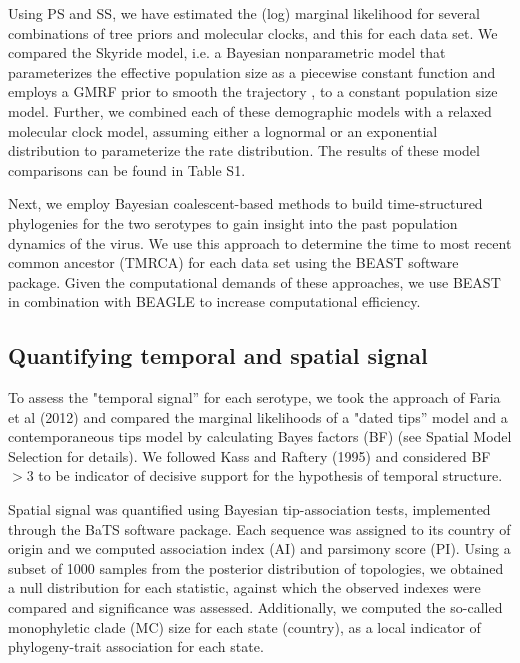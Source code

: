 \documentclass[10pt]{article}
\begin{document}

Using PS and SS, we have estimated the (log) marginal likelihood for several combinations of tree priors and molecular clocks, and this for each data set.
We compared the Skyride model, i.e. a Bayesian nonparametric model that parameterizes the effective population size as a piecewise constant function and employs a GMRF prior to smooth the trajectory \cite{skyride}, to a constant population size model.
Further, we combined each of these demographic models with a relaxed molecular clock model, assuming either a lognormal or an exponential distribution to parameterize the rate distribution.
The results of these model comparisons can be found in Table S1.

Next, we employ Bayesian coalescent-based methods to build time-structured phylogenies for the two serotypes to gain insight into the past population dynamics of the virus.
We use this approach to determine the time to most recent common ancestor (TMRCA) for each data set using the BEAST \cite{BEAST} software package.
 Given the computational demands of these approaches, we use BEAST \cite{BEAST} in combination with BEAGLE \cite{BEAGLE} to increase computational efficiency.


\subsection*{Quantifying temporal and spatial signal} 

To assess the "temporal signal'' for each serotype, we took the approach of Faria et al (2012) \cite{Faria2012} and compared the marginal likelihoods of a "dated tips'' model and a contemporaneous tips model by calculating Bayes factors (BF) \cite{Suchard2001,KassRaftery1995} (see Spatial Model Selection for details).
We followed Kass and Raftery (1995) \cite{KassRaftery1995} and considered BF$>3$ to be indicator of decisive support for the hypothesis of temporal structure.

Spatial signal was quantified using Bayesian tip-association tests, implemented through the BaTS software package\cite{bats}.
Each sequence was assigned to its country of origin and we computed association index (AI) and parsimony score (PI).
Using a subset of 1000 samples from the posterior distribution of topologies, we obtained a null distribution for each statistic, against which the observed indexes were compared and significance was assessed.
Additionally, we computed the so-called monophyletic clade (MC) size for each state (country), as a local indicator of phylogeny-trait association for each state.
\end{document}
